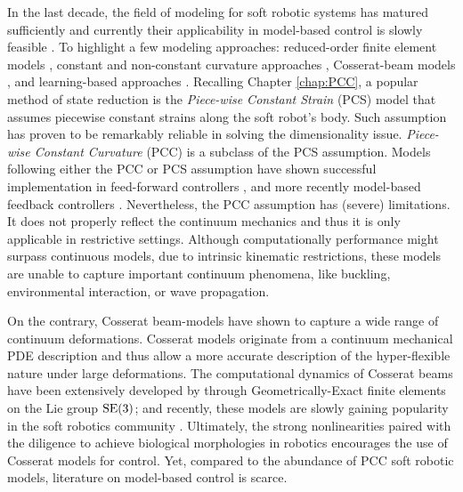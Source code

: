 In the last decade, the field of modeling for soft robotic systems has matured sufficiently and currently their applicability in model-based control is slowly feasible \cite{DellaSantina2021}. To highlight a few modeling approaches: reduced-order finite element models \cite{Duriez2013,Zhang2017,Wu2021Feb}, constant and non-constant curvature approaches \cite{Katzschmann2019,DellaSantina2020}, Cosserat-beam models \cite{Renda2020,Boyer2021}, and learning-based approaches \cite{Bruder2019}. Recalling Chapter \ref{chap:PCC}, a popular method of state reduction is the \textit{Piece-wise Constant Strain} (PCS) model that assumes piecewise constant strains along the soft robot's body. Such assumption has proven to be remarkably reliable in solving the dimensionality issue. \textit{Piece-wise Constant Curvature} (PCC) is a subclass of the PCS assumption. Models following either the PCC or PCS assumption have shown successful implementation in feed-forward controllers \cite{Falkenhahn2015}, and more recently model-based feedback controllers \cite{DellaSantina2020,Katzschmann2019}. Nevertheless, the PCC assumption has (severe) limitations. It does not properly reflect the continuum mechanics and thus it is only applicable in restrictive settings. Although computationally performance might surpass continuous models, due to intrinsic kinematic restrictions, these models are unable to capture important continuum phenomena, like buckling, environmental interaction, or wave propagation.

On the contrary, Cosserat beam-models have shown to capture a wide range of continuum deformations. Cosserat models originate from a continuum mechanical PDE description and thus allow a more accurate description of the hyper-flexible nature under large deformations. The computational dynamics of Cosserat beams have been extensively developed by \cite{Simo1986} through Geometrically-Exact finite elements on the Lie group $\textup{\textrm{SE}}(3)$; and recently, these models are slowly gaining popularity in the soft robotics community \cite{Renda2018,Renda2020,Boyer2021,Till2019,Gazzola2018}. Ultimately, the strong nonlinearities paired with the diligence to achieve biological morphologies in robotics encourages the use of Cosserat models for control. Yet, compared to the abundance of PCC soft robotic models, literature on model-based control is scarce.

